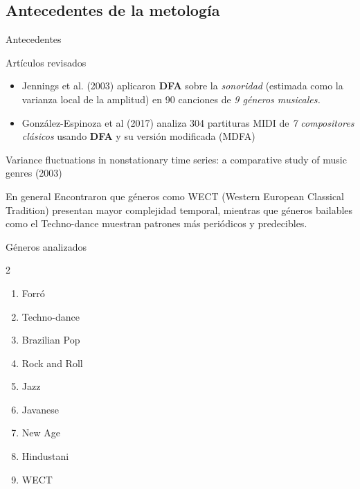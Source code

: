 \documentclass[11pt]{beamer}
\begin{document}
\subsection{Antecedentes de la metología}

\begin{frame}{Antecedentes}
\begin{block}{Artículos revisados}
\begin{itemize}
\item Jennings et al. (2003) aplicaron \textbf{DFA} sobre la \textit{sonoridad} (estimada como la varianza local de la amplitud) en 90 canciones de \textit{9 géneros musicales.}
\item González-Espinoza et al (2017) analiza 304 partituras MIDI de \textit{7 compositores clásicos} usando \textbf{DFA} y su versión modificada (MDFA)
\end{itemize}
\end{block}

\end{frame}

\begin{frame}{Variance fluctuations in nonstationary time series: a comparative study of music genres (2003)}
\begin{block}{En general}
Encontraron que géneros como WECT (Western European Classical Tradition) presentan mayor complejidad temporal, mientras que géneros bailables como el Techno-dance muestran patrones más periódicos y predecibles.
\end{block}
\begin{block}{Géneros analizados}
\begin{multicols}{2}
\begin{enumerate}
\item Forró
\item Techno-dance
\item Brazilian Pop
\item Rock and Roll
\item Jazz
\item Javanese
\item New Age
\item Hindustani
\item WECT
\end{enumerate}
\end{multicols}
\end{block}
\end{frame}
\end{document}
